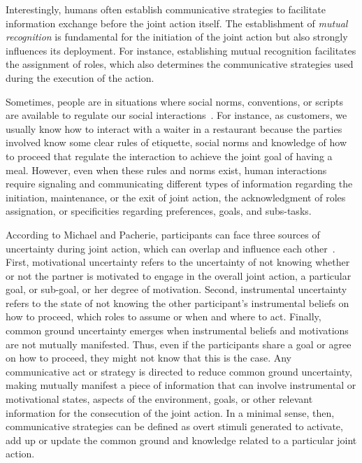 \documentclass[a4paper,11pt,twoside]{StyleThese}
\begin{document}
Interestingly, humans often establish communicative strategies to facilitate information exchange before the joint action itself. The establishment of \emph{mutual recognition} is fundamental for the initiation of the joint action but also strongly influences its deployment. For instance, establishing mutual recognition facilitates the assignment of roles, which also determines the communicative strategies used during the execution of the action. 

Sometimes, people are in situations where social norms, conventions, or scripts are available to regulate our social interactions~\cite{schank_1977_scripts,andrews_2012_apes, castro_2020_social}. For instance, as customers, we usually know how to interact with a waiter in a restaurant because the parties involved know some clear rules of etiquette, social norms and knowledge of how to proceed that regulate the interaction to achieve the joint goal of having a meal. However, even when these rules and norms exist, human interactions require signaling and communicating different types of information regarding the initiation, maintenance, or the exit of joint action, the acknowledgment of roles assignation, or specificities regarding preferences, goals, and subs-tasks. 

According to Michael and Pacherie, participants can face three sources of uncertainty during joint action, which can overlap and influence each other~\cite{michael_2015_commitments}. First, motivational uncertainty refers to the uncertainty of not knowing whether or not the partner is motivated to engage in the overall joint action, a particular goal, or sub-goal, or her degree of motivation. Second, instrumental uncertainty refers to the state of not knowing the other participant’s instrumental beliefs on how to proceed, \ie which roles to assume or when and where to act. Finally, common ground uncertainty emerges when instrumental beliefs and motivations are not mutually manifested. Thus, even if the participants share a goal or agree on how to proceed, they might not know that this is the case. Any communicative act or strategy is directed to reduce common ground uncertainty, making mutually manifest a piece of information that can involve instrumental or motivational states, aspects of the environment, goals, or other relevant information for the consecution of the joint action. In a minimal sense, then, communicative strategies can be defined as overt stimuli generated to activate, add up or update the common ground and knowledge related to a particular joint action. 
\end{document}
